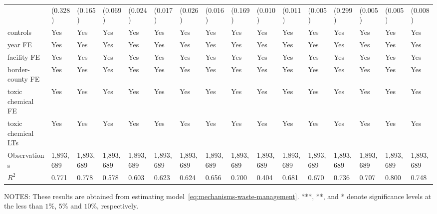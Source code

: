\begin{table}[H]
{\begin{tabular}{@{}llllllllllllllll@{}}
            & (0.328)   & (0.165)   & (0.069)   & (0.024)    & (0.017)   & (0.026)   & (0.016)   & (0.169)         & (0.010)   & (0.011)  & (0.005)  & (0.299)  & (0.005)  & (0.005)       & (0.008)         \\
            controls           & Yes       & Yes       & Yes       & Yes        & Yes       & Yes       & Yes       & Yes             & Yes       & Yes       & Yes       & Yes       & Yes       & Yes            & Yes              \\
            year FE            & Yes       & Yes       & Yes       & Yes        & Yes       & Yes       & Yes       & Yes             & Yes       & Yes       & Yes       & Yes       & Yes       & Yes            & Yes              \\
            facility FE        & Yes       & Yes       & Yes       & Yes        & Yes       & Yes       & Yes       & Yes             & Yes       & Yes       & Yes       & Yes       & Yes       & Yes            & Yes              \\
            border-county FE   & Yes       & Yes       & Yes       & Yes        & Yes       & Yes       & Yes       & Yes             & Yes       & Yes       & Yes       & Yes       & Yes       & Yes            & Yes              \\
            toxic chemical FE  & Yes       & Yes       & Yes       & Yes        & Yes       & Yes       & Yes       & Yes             & Yes       & Yes       & Yes       & Yes       & Yes       & Yes            & Yes              \\
            toxic chemical LTs & Yes       & Yes       & Yes       & Yes        & Yes       & Yes       & Yes       & Yes             & Yes       & Yes       & Yes       & Yes       & Yes       & Yes            & Yes              \\ \midrule
            Observations       & 1,893,689 & 1,893,689 & 1,893,689 & 1,893,689  & 1,893,689 & 1,893,689 & 1,893,689 & 1,893,689       & 1,893,689 & 1,893,689 & 1,893,689 & 1,893,689 & 1,893,689 & 1,893,689      & 1,893,689        \\
            $R^2$              & 0.771     & 0.778     & 0.578     & 0.603      & 0.623     & 0.624     & 0.656     & 0.700           & 0.404     & 0.681     & 0.670     & 0.736     & 0.707    & 0.800         & 0.748           \\ \bottomrule \bottomrule
        \end{tabular}%
    }
    \begin{minipage}{\columnwidth}
        \vspace{0.05in}
        \tiny NOTES: These results are obtained from estimating model~\ref{eq:mechanisms-waste-management}. ***, **, and * denote significance levels at the less than $1\%$, $5\%$ and $10\%$, respectively.
    \end{minipage}
\end{table}